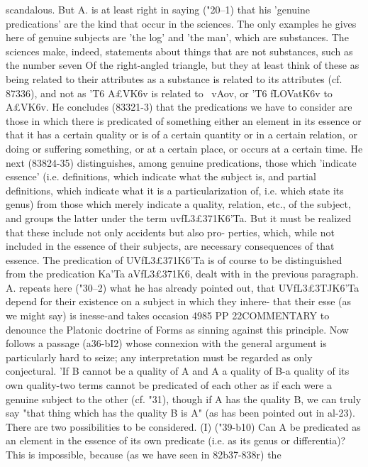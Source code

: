 {{{{{{{{{{{{{{{{{{{{scandalous. But A. is at least right in saying ("20--1) that his
'genuine predications' are the kind that occur in the sciences.
The only examples he gives here of genuine subjects are 'the log'
and 'the man', which are substances. The sciences make, indeed,
statements about things that are not substances, such as the
number seven Of the right-angled triangle, but they at least
think of these as being related to their attributes as a substance
is related to its attributes (cf. 87336), and not as 'T6 A£VK6v is
related to ~vAov, or 'T6 fLOVatK6v to A£VK6v. He concludes (83321-3)
that the predications we have to consider are those in which there
is predicated of something either an element in its essence or that
it has a certain quality or is of a certain quantity or in a certain
relation, or doing or suffering something, or at a certain place,
or occurs at a certain time.
He next (83824-35) distinguishes, among genuine predications,
those which 'indicate essence' (i.e. definitions, which indicate
what the subject is, and partial definitions, which indicate what
it is a particularization of, i.e. which state its genus) from those
which merely indicate a quality, relation, etc., of the subject,
and groups the latter under the term uvfL{3£{371K6'Ta. But it must
be realized that these include not only accidents but also pro-
perties, which, while not included in the essence of their subjects,
are necessary consequences of that essence. The predication of
UVfL{3£{371K6'Ta is of course to be distinguished from the predication
Ka'Ta aVfL{3£{371K6, dealt with in the previous paragraph. A. repeats
here ("30--2) what he has already pointed out, that UVfL{3£{3TJK6'Ta
depend for their existence on a subject in which they inhere-
that their esse (as we might say) is inesse-and takes occasion
4985
PP
22COMMENTARY
to denounce the Platonic doctrine of Forms as sinning against
this principle.
Now follows a passage (a36-bI2) whose connexion with the
general argument is particularly hard to seize; any interpretation
must be regarded as only conjectural. 'If B cannot be a quality
of A and A a quality of B-a quality of its own quality-two
terms cannot be predicated of each other as if each were a genuine
subject to the other (cf. "31), though if A has the quality B, we
can truly say "that thing which has the quality B is A" (as has
been pointed out in al-23). There are two possibilities to be
considered. (I) ("39-b10) Can A be predicated as an element in
the essence of its own predicate (i.e. as its genus or differentia)?
This is impossible, because (as we have seen in 82b37-838r) the
}}}}}}}}}}}}}}}}}}}}}}}}}}}}
